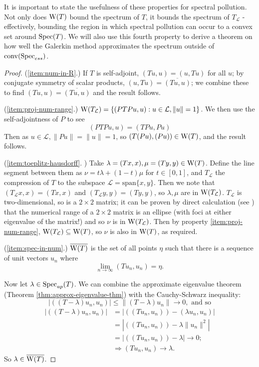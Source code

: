 \documentclass[../main.tex]{subfiles}
\begin{document}
It is important to state the usefulness of these properties for spectral pollution. Not only does $\mathrm{W}(T)$ bound the spectrum of $T$,
it bounds the spectrum of $T_\mathcal{L}$ - effectively, bounding the region in which spectral pollution can occur to a convex set around $\mathrm{Spec}(T)$.
We will also use this fourth property to derive a theorem on how well the Galerkin method approximates the spectrum outside of $\mathrm{conv}(\mathrm{Spec}_{ess})$.

\begin{proof}
(\ref{item:num-in-R}.) If $T$ is self-adjoint, $(Tu, u) = (u, Tu)$ for all $u$; by conjugate symmetry of scalar products, $(u, Tu) = \overline{(Tu, u)}$; we combine these to find $(Tu, u) = \overline{(Tu, u)}$ and the result follows. 

(\ref{item:proj-num-range}.) $\mathrm{W}(T_\mathcal{L}) = \{( PTPu, u ) : u \in \mathcal{L}, \|u\|=1\}$.
We then use the self-adjointness of $P$ to see
$$( PTPu, u ) = ( TPu, Pu )$$
Then as $u \in \mathcal{L}, \|Pu\| = \|u\| = 1$,
so $( T(Pu), (Pu) ) \in \mathrm{W}(T)$, and the result follows.

(\ref{item:toeplitz-hausdorff}. \cite{gustafson1997numerical}) Take $\lambda = (Tx, x), \mu = (Ty, y) \in \mathrm{W}(T)$. Define the line segment between them as 
$\nu = t\lambda + (1-t)\mu$ for $t \in [0, 1]$, and $T_\mathcal{L}$ the compression of $T$ to the subspace 
$\mathcal{L} = \text{span}\{x, y\}$. Then we note that $(T_\mathcal{L} x, x) = (Tx, x)$ and $(T_\mathcal{L} y, y) = (Ty, y)$, so $\lambda, \mu$ are in
$\mathrm{W}(T_\mathcal{L})$. $T_\mathcal{L}$ is two-dimensional, so is a $2 \times 2$ matrix; it can be proven by direct calculation (see \cite{gustafson1997numerical}) that the numerical range of a $2 \times 2$ matrix is an ellipse (with foci at either eigenvalue of the matrix!) and so $\nu$ is in $\mathrm{W}(T_\mathcal{L})$.
Then by property \ref{item:proj-num-range}, $\mathrm{W}(T_\mathcal{L}) \subseteq \mathrm{W}(T)$, so $\nu$ is also in $\mathrm{W}(T)$, as required.

(\ref{item:spec-in-num}.) $\overline{\mathrm{W}(T)}$ is the set of all points $\eta$ such that there is a sequence of unit vectors $u_n$ where
$$\lim_{n\rightarrow \infty}( Tu_n, u_n ) = \eta.$$

Now let $\lambda \in \mathrm{Spec}_{ap}(T)$. We can combine the approximate eigenvalue theorem (Theorem \ref{thm:approx-eigenvalue-thm}) with the Cauchy-Schwarz inequality:
$$|( (T - \lambda)u_n, u_n )| \leq \|(T - \lambda)u_n\| \rightarrow 0,\text{ and so}$$
\begin{equation*}
\begin{split}
|( (T - \lambda)u_n, u_n )| &  = |( (Tu_n, u_n) ) - ( \lambda u_n, u_n )| \\
& = |( (Tu_n, u_n) ) - \lambda \|u_n\|^2| \\
& = |( (Tu_n, u_n) ) - \lambda| \rightarrow 0; \\
& \Rightarrow ( Tu_n, u_n ) \rightarrow \lambda.
\end{split}
\end{equation*}
So $\lambda \in \overline{\mathrm{W}(T)}$.
\end{proof}
\end{document}
